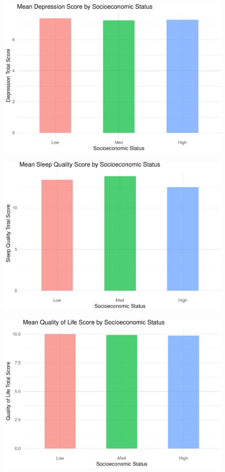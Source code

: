 \documentclass[man]{apa6}
\begin{document}
\begin{figure}
\centering
\includegraphics{APA_Document_files/figure-latex/Plot 1-1.pdf}
\caption{}
\end{figure}

\begin{figure}
\centering
\includegraphics{APA_Document_files/figure-latex/Plot 2-1.pdf}
\caption{}
\end{figure}

\begin{figure}
\centering
\includegraphics{APA_Document_files/figure-latex/Plot 3-1.pdf}
\caption{}
\end{figure}
\end{document}
